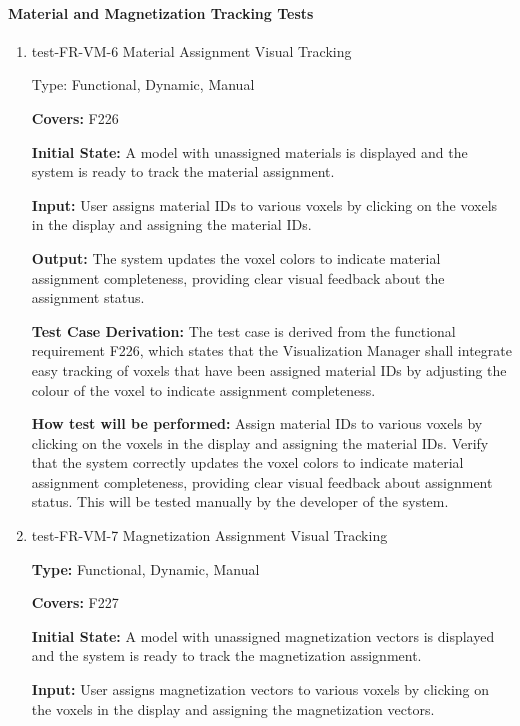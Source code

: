 \documentclass[12pt, titlepage]{article}
\begin{document}
\paragraph{Material and Magnetization Tracking Tests}

\begin{enumerate}

\item{test-FR-VM-6 Material Assignment Visual Tracking\\}

Type: Functional, Dynamic, Manual

\textbf{Covers:} F226
					
\textbf{Initial State:} A model with unassigned materials is displayed and the system is ready to track the material assignment.
					
\textbf{Input:} User assigns material IDs to various voxels by clicking on the voxels in the display and assigning the material IDs.
					
\textbf{Output:} The system updates the voxel colors to indicate material assignment completeness, providing clear visual feedback about the assignment status.

\textbf{Test Case Derivation:} The test case is derived from the functional requirement F226, which states that the Visualization Manager shall integrate easy tracking of voxels that have been assigned material IDs by adjusting the colour of the voxel to indicate assignment completeness.
					
\textbf{How test will be performed:} Assign material IDs to various voxels by clicking on the voxels in the display and assigning the material IDs. Verify that the system correctly updates the voxel colors to indicate material assignment completeness, providing clear visual feedback about assignment status. This will be tested manually by the developer of the system.

\item{test-FR-VM-7 Magnetization Assignment Visual Tracking\\}

\textbf{Type:} Functional, Dynamic, Manual

\textbf{Covers:} F227
					
\textbf{Initial State:} A model with unassigned magnetization vectors is displayed and the system is ready to track the magnetization assignment.
					
\textbf{Input:} User assigns magnetization vectors to various voxels by clicking on the voxels in the display and assigning the magnetization vectors.
					

\end{enumerate}
\end{document}
